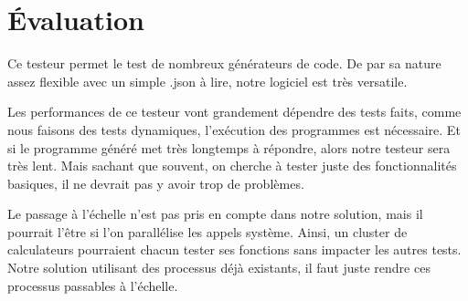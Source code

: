 \chapter{Évaluation}

Ce testeur permet le test de nombreux générateurs de code. De par sa nature assez
flexible avec un simple .json à lire, notre logiciel est très versatile.

Les performances de ce testeur vont grandement dépendre des tests faits, comme
nous faisons des tests dynamiques, l'exécution des programmes est nécessaire.
Et si le programme généré met très longtemps à répondre, alors notre testeur sera
très lent. Mais sachant que souvent, on cherche à tester juste des fonctionnalités
basiques, il ne devrait pas y avoir trop de problèmes.

Le passage à l'échelle n'est pas pris en compte dans notre solution, mais il pourrait
l'être si l'on parallélise les appels système. Ainsi, un cluster de calculateurs
pourraient chacun tester ses fonctions sans impacter les autres tests. Notre
solution utilisant des processus déjà existants, il faut juste rendre ces processus
passables à l'échelle.
